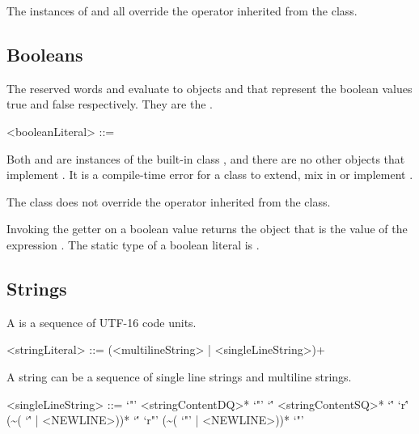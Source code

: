 \documentclass[makeidx]{article}
\begin{document}
{\LMHash{}%
The instances of  and  all override the \lit{==} operator inherited from the  class.


\subsection{Booleans}

\LMHash{}%
The reserved words \TRUE{} and \FALSE{} evaluate to objects
 and
that represent the boolean values true and false respectively.
They are the .

\begin{grammar}
<booleanLiteral> ::= \TRUE{}
  \alt \FALSE{}
\end{grammar}

\LMHash{}%
Both  and  are instances of
the built-in class ,
and there are no other objects that implement .
It is a compile-time error for a class to
extend, mix in or implement .

\LMHash{}%
The  class does not override the \lit{==} operator inherited from
the  class.

\LMHash{}%
Invoking the getter  on a boolean value returns the  object that is the value of the expression .
The static type of a boolean literal is .


\subsection{Strings}

\LMHash{}%
A  is a sequence of UTF-16 code units.


\begin{grammar}
<stringLiteral> ::= (<multilineString> | <singleLineString>)+
\end{grammar}

\LMHash{}%
A string can be a sequence of single line strings and multiline strings.

\begin{grammar}
<singleLineString> ::= `"' <stringContentDQ>* `"'
  \alt `\'' <stringContentSQ>* `\''
  \alt `r\'' (\~{}( `\'' | <NEWLINE>))* `\''
  \alt `r"' (\~{}( `"' | <NEWLINE>))* `"'
\end{grammar}

}
\end{document}
